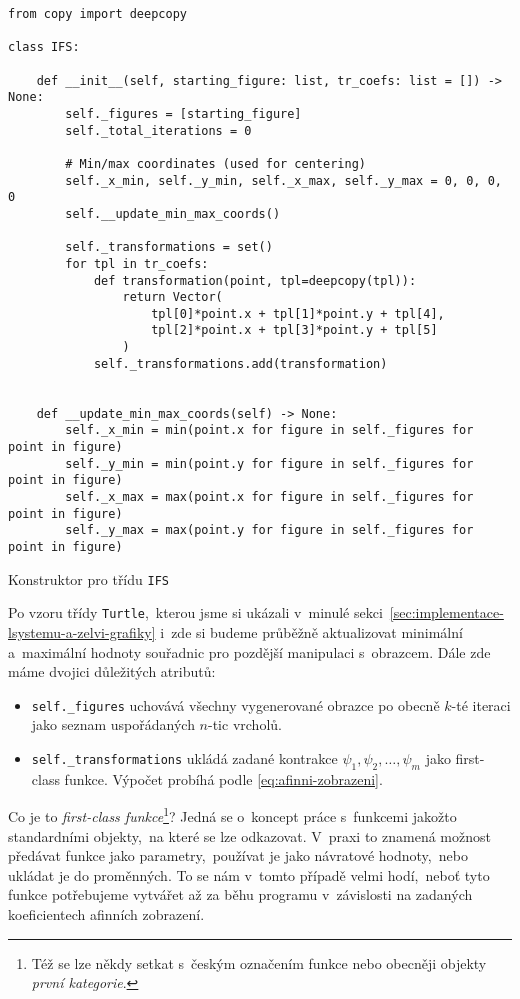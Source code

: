 \begin{program}[h]
\begin{lstlisting}[style=python]
from copy import deepcopy

class IFS:

    def __init__(self, starting_figure: list, tr_coefs: list = []) -> None:
        self._figures = [starting_figure]
        self._total_iterations = 0

        # Min/max coordinates (used for centering)
        self._x_min, self._y_min, self._x_max, self._y_max = 0, 0, 0, 0
        self.__update_min_max_coords()

        self._transformations = set()
        for tpl in tr_coefs:
            def transformation(point, tpl=deepcopy(tpl)):
                return Vector(
                    tpl[0]*point.x + tpl[1]*point.y + tpl[4],
                    tpl[2]*point.x + tpl[3]*point.y + tpl[5]
                )
            self._transformations.add(transformation)
    
    
    def __update_min_max_coords(self) -> None:
        self._x_min = min(point.x for figure in self._figures for point in figure)
        self._y_min = min(point.y for figure in self._figures for point in figure)
        self._x_max = max(point.x for figure in self._figures for point in figure)
        self._y_max = max(point.y for figure in self._figures for point in figure)
\end{lstlisting}
    \caption{Konstruktor pro třídu \texttt{IFS}}
    \label{prog:konstruktor-ifs}
\end{program}
Po vzoru třídy \texttt{Turtle},~kterou jsme si ukázali v~minulé sekci~\ref{sec:implementace-lsystemu-a-zelvi-grafiky} i~zde si budeme průběžně aktualizovat minimální a~maximální hodnoty souřadnic pro pozdější manipulaci s~obrazcem. Dále zde máme dvojici důležitých atributů:
\begin{itemize}
    \item \texttt{self.\_figures} uchovává všechny vygenerované obrazce po obecně $k$-té iteraci jako seznam uspořádaných $n$-tic vrcholů.
    \item \texttt{self.\_transformations} ukládá zadané kontrakce $\psi_1,\psi_2,\ldots,\psi_m$ jako first-class funkce. Výpočet probíhá podle \eqref{eq:afinni-zobrazeni}.
\end{itemize}
Co je to \emph{first-class funkce}\footnote{Též se lze někdy setkat s~českým označením funkce nebo obecněji objekty \emph{první kategorie}.}? Jedná se o~koncept práce s~funkcemi jakožto standardními objekty,~na které se lze odkazovat. V~praxi to znamená možnost předávat funkce jako parametry,~používat je jako návratové hodnoty,~nebo ukládat je do proměnných. To se nám v~tomto případě velmi hodí,~neboť tyto funkce potřebujeme vytvářet až za běhu programu v~závislosti na zadaných koeficientech afinních zobrazení.

